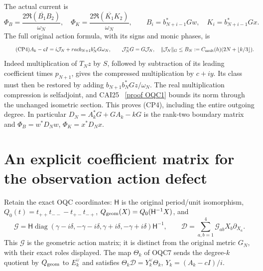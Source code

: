 \documentclass[11pt]{article}
\begin{document}
The actual current is
\begin{equation}\tag{CP3}
 \Phi_B=\frac{2\Re(\overline{B_1}B_2)}{\omega_N},\quad
 \Phi_K=\frac{2\Re(\overline{K_1}K_2)}{\omega_N},\qquad
 B_i=b_{N+i-1}^*Gw,\quad K_i=b_{N+i-1}^*Gx.
\end{equation}
The full original action formula, with its signs and monic phases, is
\begin{equation}\tag{CP4}
 A_k-cI=i\mathcal J_N+
rac{b_{N+1}b_N^*G}{\omega_N},\qquad
 \mathcal J_N^*G=G\mathcal J_N,
 \quad \|\mathcal J_N\|_G\le
 B_N:=C_{\rm mult}(h)(2N+\lfloor k/3\rfloor).
\end{equation}
Indeed multiplication of $T_Nz$ by $S$, followed by subtraction of its
leading coefficient times $p_{N+1}$, gives the compressed multiplication
by $c+iy$. Its class must then be restored by adding
$b_{N+1}b_N^*Gz/\omega_N$. The real multiplication compression is
selfadjoint, and CAI25 \cite{CPProgramme}%
~\href{https://github.com/KokunoYumeto/zeta-function-research-reader/blob/5992ad50c0f2a06921f1fcaded7b4e38097c0739/workbenches/splitzero-tandem/continuations/20260920-original-kernel-mixed-determinants/cumulative/09_UPDATED_JOINT_NOTE.tex\#L11282}{[proof OQC1]}%
{} bounds its norm through the
unchanged isometric section. This proves (CP4), including the entire
outgoing degree. In particular
$D_N=A_k^*G+GA_k-kG$ is the rank-two boundary matrix and
$\Phi_B=w^*D_Nw$, $\Phi_K=x^*D_Nx$.

\section{An explicit coefficient matrix for the observation action defect}
Retain the exact OQC coordinates: $\mathsf H$ is the original period/unit
isomorphism, $Q_0(t)=t_{++}t_{--}-t_{+-}t_{-+}$,
$Q_{\rm geom}(X)=Q_0(\mathsf H^{-1}X)$, and
\[
 \mathcal G=\mathsf H\operatorname{diag}(\gamma-i\delta,-\gamma-i\delta,
                    \gamma+i\delta,-\gamma+i\delta)\mathsf H^{-1},
 \qquad \mathcal D=\sum_{a,b=1}^4\mathcal G_{ab}X_b\partial_{X_a}.
\]
This $\mathcal G$ is the geometric action matrix; it is distinct from
the original metric $G_N$, with their exact roles displayed.
The map $\Theta_k$ of OQC7 sends the degree-$k$ quotient by
$Q_{\rm geom}$ to $E_k^\vee$ and satisfies
$\Theta_k\mathcal D=Y_k^\vee\Theta_k$, $Y_k=(A_k-cI)/i$.
\end{document}
